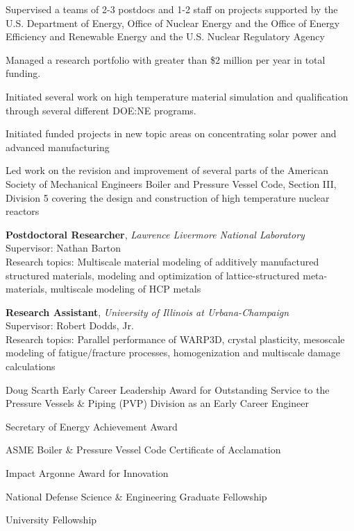 Supervised a teams of 2-3 postdocs and 1-2 staff on projects
supported by the U.S. Department of Energy, Office of Nuclear Energy and 
the Office of Energy Efficiency and Renewable Energy
and the U.S. Nuclear Regulatory Agency

Managed a research portfolio with greater than \$2 million per year in total funding.  

Initiated several work on high temperature material simulation and qualification through several different DOE:NE programs.

Initiated funded projects in new topic areas on concentrating solar power and advanced manufacturing

Led work on the revision and improvement of several parts of the American Society of 
Mechanical Engineers Boiler and Pressure Vessel Code, Section III, Division 5 covering the
design and construction of high temperature nuclear reactors

\textbf{Postdoctoral Researcher}, \emph{Lawrence Livermore National
Laboratory} \\
Supervisor: Nathan Barton \\
Research topics: Multiscale material modeling of additively manufactured
structured materials, modeling and optimization of lattice-structured
meta-materials, multiscale modeling of HCP metals

\textbf{Research Assistant}, \emph{University of Illinois at Urbana-Champaign}
\\
Supervisor: Robert Dodds, Jr. \\
Research topics: Parallel performance of WARP3D, crystal plasticity,
mesoscale modeling of fatigue/fracture processes, homogenization and
multiscale damage calculations


Doug Scarth Early Career Leadership Award for Outstanding Service to the Pressure Vessels \& Piping (PVP) Division as an Early Career Engineer 

Secretary of Energy Achievement Award 

ASME Boiler \& Pressure Vessel Code Certificate of Acclamation 

Impact Argonne Award for Innovation 

National Defense Science \& Engineering Graduate Fellowship 

University Fellowship 

